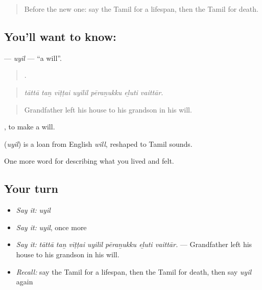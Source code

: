 \label{lesson:TA-C505-uyil}



\begin{quote}
Before the new one: say the Tamil for a lifespan, then the Tamil for death.
\end{quote}

\subsection*{You'll want to know: }
\textbf{} — \emph{uyil} — \textquotedblleft{}a will\textquotedblright{}.

\begin{quote}
      .
\end{quote}

\begin{quote}
\emph{tāttā taṉ vīṭṭai uyilil pēraṉukku eḻuti vaittār.}
\end{quote}

\begin{quote}
Grandfather left his house to his grandson in his will.
\end{quote}

 , to make a will.

\begin{cousinweb}
\textbf{} (\emph{uyil}) is a loan from English \emph{will}, reshaped to Tamil sounds.
\end{cousinweb}

\begin{grammarlens}[title={What you've built}]
One more word for describing what you lived and felt.
\end{grammarlens}

\subsection*{Your turn}
\begin{itemize}
\raggedright
  \item \emph{Say it:} \emph{uyil}
  \item \emph{Say it:} \emph{uyil}, once more
  \item \emph{Say it:} \emph{tāttā taṉ vīṭṭai uyilil pēraṉukku eḻuti vaittār.} — Grandfather left his house to his grandson in his will.
  \item \emph{Recall:} say the Tamil for a lifespan, then the Tamil for death, then say \emph{uyil} again
\end{itemize}

